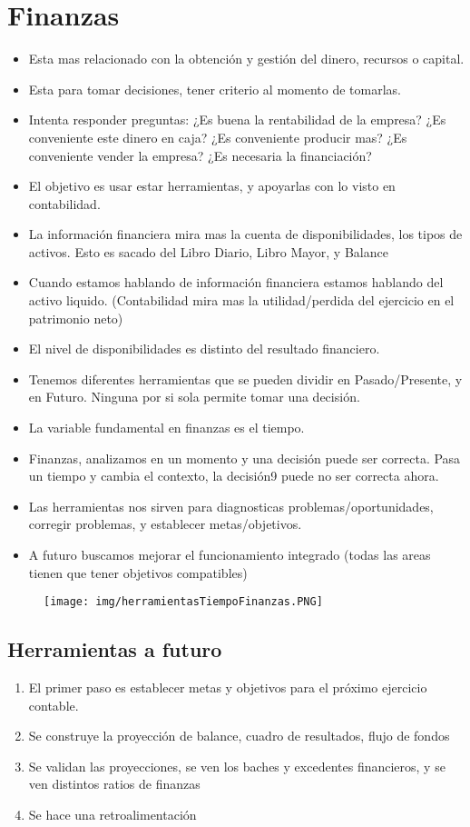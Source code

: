 \documentclass[titlepage,a4paper]{article}
\begin{document}
\section{Finanzas}
\begin{itemize}
\item Esta mas relacionado con la obtención y gestión del dinero, recursos o capital. 
\item Esta para tomar decisiones, tener criterio al momento de tomarlas.
\item Intenta responder preguntas: ¿Es buena la rentabilidad de la empresa? ¿Es conveniente este dinero en caja? ¿Es conveniente producir mas? ¿Es conveniente vender la empresa? ¿Es necesaria la financiación?
\item El objetivo es usar estar herramientas, y apoyarlas con lo visto en contabilidad.
\item La información financiera mira mas la cuenta de disponibilidades, los tipos de activos. Esto es sacado del Libro Diario, Libro Mayor, y Balance
\item Cuando estamos hablando de información financiera estamos hablando del activo liquido. (Contabilidad mira mas la utilidad/perdida del ejercicio en el patrimonio neto)
\item El nivel de disponibilidades es distinto del resultado financiero.
\item Tenemos diferentes herramientas que se pueden dividir en Pasado/Presente, y en Futuro. Ninguna por si sola permite tomar una decisión.
\item La variable fundamental en finanzas es el tiempo.
\item Finanzas, analizamos en un momento y una decisión puede ser correcta. Pasa un tiempo y cambia el contexto, la decisión9 puede no ser correcta ahora.
\item Las herramientas nos sirven para diagnosticas problemas/oportunidades, corregir problemas, y establecer metas/objetivos.
\item A futuro buscamos mejorar el funcionamiento integrado (todas las areas tienen que tener objetivos compatibles)
\end{itemize}


\begin{figure}[!htb]
    \centering
    \texttt{[image: img/herramientasTiempoFinanzas.PNG]}
\end{figure}

\subsection*{Herramientas a futuro}
\begin{enumerate}
\item El primer paso es establecer metas y objetivos para el próximo ejercicio contable.
\item Se construye la proyección de balance, cuadro de resultados, flujo de fondos
\item Se validan las proyecciones, se ven los baches y excedentes financieros, y se ven distintos ratios de finanzas
\item Se hace una retroalimentación
\end{enumerate}
\end{document}

